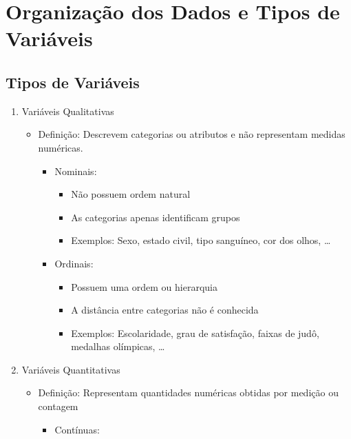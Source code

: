 \documentclass[12pt]{article}
\begin{document}
\section{Organização dos Dados e Tipos de Variáveis}
    \subsection{Tipos de Variáveis}
    \begin{enumerate}
        \item Variáveis Qualitativas
        \begin{itemize}
            \item Definição: Descrevem categorias ou atributos e não representam 
            medidas numéricas.
            \begin{itemize}
                \item Nominais:
                \begin{itemize}
                    \item Não possuem ordem natural
                    \item As categorias apenas identificam grupos
                    \item Exemplos: Sexo, estado civil, tipo sanguíneo, cor dos 
                    olhos, \dots
                \end{itemize}
                \item Ordinais:
                \begin{itemize}
                    \item Possuem uma ordem ou hierarquia
                    \item A distância entre categorias não é conhecida
                    \item Exemplos: Escolaridade, grau de satisfação, faixas de 
                    judô, medalhas olímpicas, \dots
                \end{itemize}
            \end{itemize}
        \end{itemize}
        \item Variáveis Quantitativas
        \begin{itemize}
            \item Definição: Representam quantidades numéricas obtidas por 
            medição ou contagem
            \begin{itemize}
                \item Contínuas:
                \begin{itemize}

\end{itemize}
\end{itemize}
\end{itemize}
\end{enumerate}
\end{document}
